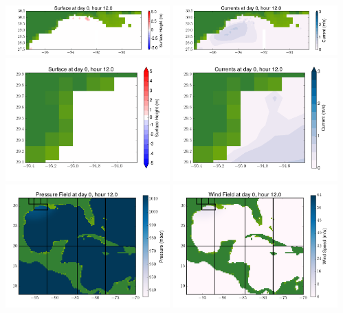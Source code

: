 \documentclass[11pt]{article}
\begin{document}
\includegraphics[width=0.475\textwidth]{frame0014fig4.png}
\vskip 10pt 
\includegraphics[width=0.475\textwidth]{frame0014fig5.png}
\includegraphics[width=0.475\textwidth]{frame0014fig6.png}
\vskip 10pt 
\includegraphics[width=0.475\textwidth]{frame0014fig7.png}
\includegraphics[width=0.475\textwidth]{frame0014fig8.png}
\vskip 10pt 
\includegraphics[width=0.475\textwidth]{frame0014fig9.png}
\end{document}
